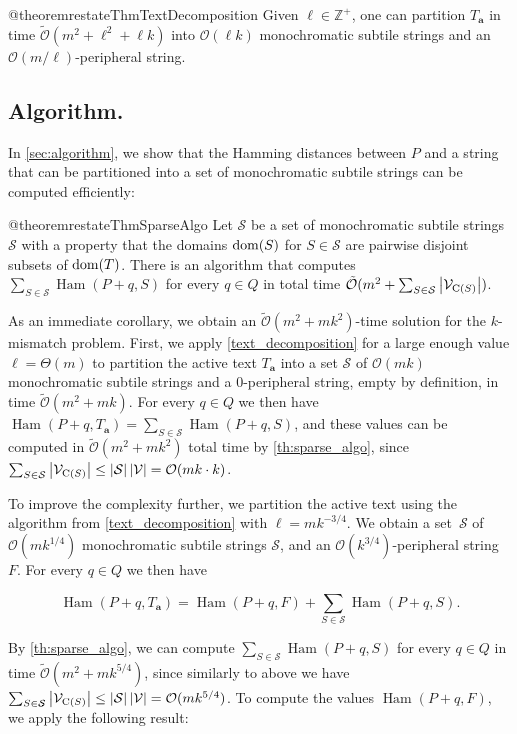 \documentclass[a4paper,11pt]{article}
\let\Cref\cref
\newcommand{\Z}{\mathbb{Z}}
\renewcommand{\O}{\mathcal{O}}
\newcommand{\tO}{\tilde{\mathcal{O}}}
\renewcommand{\S}{\mathcal{S}}
\newcommand{\V}{\mathcal{V}}
\newcommand{\Ta}{T_\mathbf{a}}
\DeclareMathOperator*{\Ham}{Ham}
\newcommand{\absolute}[1]{\left\lvert#1\right\rvert}
\begin{document}
\begin{restatable*}{@theorem}{restateThmTextDecomposition}\label{text_decomposition}
Given $\ell \in \Z^+$, one can partition $\Ta$ in time $\tO(m^2 + \ell^2 + \ell k)$ into $\O(\ell k)$ monochromatic subtile strings and an $\O(m / \ell)$-peripheral string.
\end{restatable*}

\subsection{Algorithm.}
In \cref{sec:algorithm}, we show that the Hamming distances between $P$ and a string that can be partitioned into a set of monochromatic subtile strings can be computed efficiently: 

\begin{restatable*}{@theorem}{restateThmSparseAlgo}
\label{th:sparse_algo}
Let $\S$ be a set of monochromatic subtile strings $\S$ with a property that the domains $\operatorname*{dom}(S)$ for $S \in \S$ are pairwise disjoint subsets of $\operatorname*{dom}(T)$. There is an algorithm that computes
$\sum_{S \in \S} \Ham(P + q, S)$ for every $q \in Q$ in total time $\tO(m^2 + \sum_{S \in \S} \absolute{\V_{\getchar{S}}})$.
\end{restatable*}

As an immediate corollary, we obtain an $\tO(m^2 + mk^2)$-time solution for the $k$-mismatch problem. First, we apply \Cref{text_decomposition} for a large enough value $\ell = \Theta(m)$ to partition the active text $\Ta$ into a set $\S$ of $\O(mk)$ monochromatic subtile strings and a $0$-peripheral string, empty by definition, in time $\tO(m^2 + mk)$. For every $q \in Q$ we then have $\Ham(P + q, \Ta) = \sum_{S \in \S} \Ham(P + q, S)$, and these values can be computed in $\tO(m^2 + mk^{2})$ total time by \cref{th:sparse_algo}, since $\sum_{S \in \S} \absolute{\V_{\getchar{S}}} \le \absolute{\S} \absolute{\V} = \O(mk \cdot k)$. 

To improve the complexity further, we partition the active text using the algorithm from \Cref{text_decomposition} with $\ell = mk^{-3/4}$.
We obtain a set~$\S$ of $\O(mk^{1/4})$ monochromatic subtile strings $\S$, and an $\O(k^{3 / 4})$-peripheral string $F$. For every $q \in Q$ we then have

\[ \Ham(P + q, \Ta) = \Ham(P + q, F) + \sum_{S \in \S} \Ham(P + q, S).\]

By \cref{th:sparse_algo}, we can compute $\sum_{S \in \S} \Ham(P + q, S)$ for every $q \in Q$ in time $\tO(m^2 + mk^{5/4})$, since similarly to above we have $\sum_{S \in \S} \absolute{\V_{\getchar{S}}} \le \absolute{\S} \absolute{\V} = \O(mk^{5/4})$. To compute the values $\Ham(P + q, F)$, we apply the following result:
\end{document}

